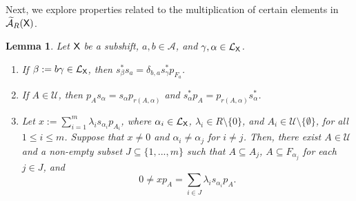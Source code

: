 \documentclass[a4paper,12pt]{amsart}
\newtheorem{lemma}[equation]{Lemma}
\theoremstyle{definition}
\theoremstyle{remark}
\numberwithin{equation}{section}
\newcommand{\osf}{{\normalfont \textsf{X}}}
\newcommand{\lang}{\CL_{\osf}}
\newcommand{\ualgshift}{\TCA_R(\osf)}
\newcommand{\alf}{\mathscr{A}}
\newcommand{\CA}{\mathcal{A}}
\newcommand{\CL}{\mathcal{L}}
\newcommand{\TCA}{\widetilde{\CA}}
\newcommand{\TCB}{\mathcal{U}}
\begin{document}
Next, we explore properties related to the multiplication of certain elements in $\ualgshift$.

\begin{lemma}\label{chucrute} Let $\osf$ be a subshift, $a,b\in \alf$, and $\gamma,\alpha \in \lang$.
\begin{enumerate}[\hspace{.3cm} \rm (1)]
\item If $\beta:=b\gamma\in \lang$, then $s_\beta^*s_a=\delta_{b,a}s_\gamma^*p_{F_a}$.\vspace{.2cm}
\item If $A\in \TCB$, then $p_As_\alpha=s_\alpha p_{r(A,\alpha)}$ and $s_\alpha^*p_A=p_{r(A,\alpha)}s_\alpha^*$.
\item Let $x:=\sum\limits_{i=1}^m \lambda_i s_{\alpha_i} p_{A_i}$, where $\alpha_i\in \lang$, $\lambda_i \in R\setminus\{0\}$, and $A_i\in \TCB\setminus\{\emptyset\}$, for all $1\leq i\leq m$. Suppose that $x\neq 0$ and $\alpha_i\neq  \alpha_j$ for $i\neq j$. Then, there exist $A\in \TCB$ and a non-empty subset $J\subseteq \{1,...,m\}$ such that $A\subseteq A_j$, $A\subseteq F_{\alpha_j}$ for each $j\in J$, and  $$0\neq xp_A=\sum\limits_{i\in J} \lambda_i s_{\alpha_i}p_A.$$
\end{enumerate}
\end{lemma}
\end{document}
